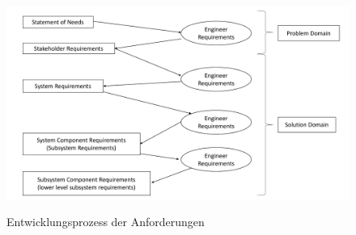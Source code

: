 \begin{figure}[H]
	\centering
	\includegraphics[scale=0.38]{img/levels-of-requirements-engineering.pdf}
	\caption{Entwicklungsprozess der Anforderungen}
	{\footnotesize \cite[Quelle: in Anlehnung an ][S.28]{hull_requirements_2011}}
	\label{abb:entwAnforderung}
\end{figure}


